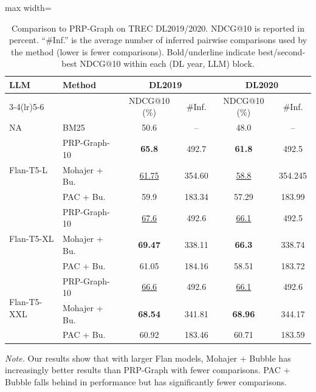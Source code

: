 \documentclass{llmxive}
\providecommand{\best}[1]{\textbf{#1}}
\providecommand{\second}[1]{\underline{#1}}
\begin{document}
\begin{table}[!t]
\centering
\small
\begin{adjustbox}{max width=\textwidth}
\begin{tabular}{@{}llcccc@{}}
\toprule
\multirow{2}{*}{LLM} & \multirow{2}{*}{Method}
& \multicolumn{2}{c}{DL2019}
& \multicolumn{2}{c}{DL2020} \\
\cmidrule(lr){3-4}\cmidrule(lr){5-6}
& & NDCG@10 (\%) & \#Inf. & NDCG@10 (\%) & \#Inf. \\
\midrule
NA & BM25 & 50.6 & -- & 48.0 & -- \\
\midrule
\multirow{3}{*}{Flan-T5-L}
& PRP-Graph-10     & \best{65.8}    & 492.7  & \best{61.8}    & 492.5  \\
& Mohajer + Bu. & \second{61.75} & 354.60 & \second{58.8}  & 354.245 \\
& PAC + Bu.     & 59.9           & 183.34 & 57.29          & 183.99 \\
\midrule
\multirow{3}{*}{Flan-T5-XL}
& PRP-Graph-10     & \second{67.6}  & 492.6  & \second{66.1}  & 492.5 \\
& Mohajer + Bu. & \best{69.47}   & 338.11 & \best{66.3}    & 338.74 \\
& PAC + Bu.     & 61.05          & 184.16 & 58.51          & 183.72 \\
\midrule
\multirow{3}{*}{Flan-T5-XXL}
& PRP-Graph-10     & \second{66.6}  & 492.6  & \second{66.1}  & 492.6 \\
& Mohajer + Bu. & \best{68.54}   & 341.81 & \best{68.96}   & 344.17 \\
& PAC + Bu.     & 60.92          & 183.46 & 60.71          & 183.59 \\
\bottomrule
\end{tabular}
\end{adjustbox}
\caption{
Comparison to PRP-Graph on TREC DL2019/2020. NDCG@10 is reported in percent.
``\#Inf.'' is the average number of inferred pairwise comparisons used by the method (lower is fewer comparisons).
Bold/underline indicate best/second-best NDCG@10 within each (DL year, LLM) block.
}
\label{tab:trec_prpgraph_comp}
\par\vspace{2pt}\footnotesize\noindent\textit{Note.} Our results show that with larger Flan models, Mohajer + Bubble has increasingly better results than PRP-Graph with fewer comparisons. PAC + Bubble falls behind in performance but has significantly fewer comparisons. 
\end{table}
\end{document}
